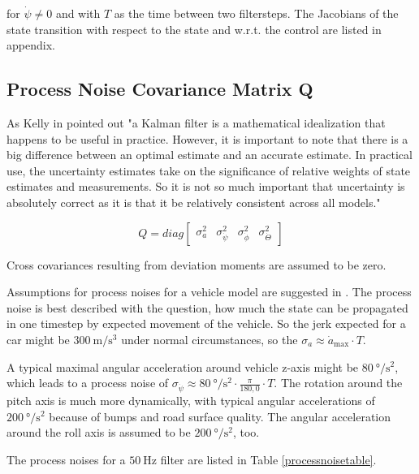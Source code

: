 \documentclass[a4paper,twoside]{article}
\begin{document}
for $\dot \psi \neq 0$ and with $T$ as the time between two filtersteps. The Jacobians of the state transition with respect to the state and w.r.t. the control are listed in appendix.

\subsection{Process Noise Covariance Matrix Q}

As Kelly in \cite{Kelly1994} pointed out "a Kalman filter is a mathematical idealization that happens to be useful in practice. However, it is important to note that there is a big difference between an optimal estimate and an accurate estimate. In practical use, the uncertainty estimates take on the significance of relative weights of state estimates and measurements. So it is not so much important that uncertainty is absolutely correct as it is that it be relatively consistent across all models."

\begin{equation}Q=diag\label{Q}\left[\begin{matrix}\sigma_{a}^2 & \sigma_{{\dot\psi}}^2 & \sigma_{{\dot\phi}}^2 & \sigma_{{\dot\Theta}}^2 \end{matrix}\right]\end{equation}

Cross covariances resulting from deviation moments are assumed to be zero.

Assumptions for process noises for a vehicle model are suggested in \cite{Kelly1994}. The process noise is best described with the question, how much the state can be propagated in one timestep by expected movement of the vehicle. So the jerk expected for a car might be $\SI{300}{\metre\per\cubic\second}$ under normal circumstances, so the $\sigma_a \approx \dot a_\text{max}\cdot T$.

A typical maximal angular acceleration around vehicle z-axis might be $\SI{80}{\degree\per\square\second}$, which leads to a process noise of $\sigma_{\dot\psi} \approx \SI{80}{\degree\per\square\second} \cdot \frac{\pi}{180{,}0} \cdot T$.
The rotation around the pitch axis is much more dynamically, with typical angular accelerations of $\SI{200}{\degree\per\square\second}$ because of bumps and road surface quality. The angular acceleration around the roll axis is assumed to be $\SI{200}{\degree\per\square\second}$, too.

The process noises for a $\SI{50}{\hertz}$ filter are listed in Table \ref{processnoisetable}.
\end{document}
